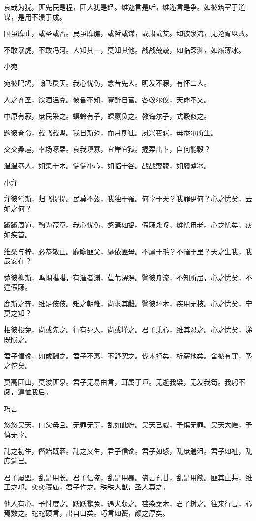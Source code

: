 哀哉为犹，匪先民是程，匪大犹是经。维迩言是听，维迩言是争。如彼筑室于道谋，是用不溃于成。

国虽靡止，或圣或否。民虽靡膴，或哲或谋，或肃或艾。如彼泉流，无沦胥以败。

不敢暴虎，不敢冯河。人知其一，莫知其他。战战兢兢，如临深渊，如履薄冰。

小宛

宛彼鸣鸠，翰飞戾天。我心忧伤，念昔先人。明发不寐，有怀二人。

人之齐圣，饮酒温克。彼昏不知，壹醉日富。各敬尔仪，天命不又。

中原有菽，庶民采之。螟蛉有子，蜾蠃负之。教诲尔子，式穀似之。

题彼脊令，载飞载鸣。我日斯迈，而月斯征。夙兴夜寐，毋忝尔所生。

交交桑扈，率场啄粟。哀我填寡，宜岸宜狱。握粟出卜，自何能穀？

温温恭人，如集于木。惴惴小心，如临于谷。战战兢兢，如履薄冰。

小弁

弁彼鸴斯，归飞提提。民莫不穀，我独于罹。何辜于天？我罪伊何？心之忧矣，云如之何？

踧踧周道，鞫为茂草。我心忧伤，惄焉如捣。假寐永叹，维忧用老。心之忧矣，疢如疾首。

维桑与梓，必恭敬止。靡瞻匪父，靡依匪母。不属于毛？不罹于里？天之生我，我辰安在？

菀彼柳斯，鸣蜩嘒嘒，有漼者渊，萑苇淠淠。譬彼舟流，不知所届，心之忧矣，不遑假寐。

鹿斯之奔，维足伎伎。雉之朝雊，尚求其雌。譬彼坏木，疾用无枝。心之忧矣，宁莫之知？

相彼投兔，尚或先之。行有死人，尚或墐之。君子秉心，维其忍之。心之忧矣，涕既陨之。

君子信谗，如或酬之。君子不惠，不舒究之。伐木掎矣，析薪扡矣。舍彼有罪，予之佗矣。

莫高匪山，莫浚匪泉。君子无易由言，耳属于垣。无逝我梁，无发我笱。我躬不阅，遑恤我后。

巧言

悠悠昊天，曰父母且。无罪无辜，乱如此幠。昊天已威，予慎无罪。昊天大幠，予慎无辜。

乱之初生，僭始既涵。乱之又生，君子信谗。君子如怒，乱庶遄沮。君子如祉，乱庶遄已。

君子屡盟，乱是用长。君子信盗，乱是用暴。盗言孔甘，乱是用餤。匪其止共，维王之邛。奕奕寝庙，君子作之。秩秩大猷，圣人莫之。

他人有心，予忖度之。跃跃毚兔，遇犬获之。荏染柔木，君子树之。往来行言，心焉数之。蛇蛇硕言，出自口矣。巧言如簧，颜之厚矣。

